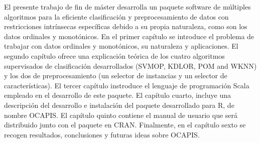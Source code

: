 
El presente trabajo de fin de máster desarrolla un paquete software de múltiples algoritmos para la eficiente clasificación y preprocesamiento de datos con restricciones intrínsecas específicas debido a su propia naturaleza, como son los datos ordinales y monotónicos. \newline
En el primer capítulo se introduce el problema de trabajar con datos ordinales y monotónicos, su naturaleza y aplicaciones. El segundo capítulo ofrece una explicación teórica de  los cuatro algoritmos supervisados de clasificación desarrollados (SVMOP, KDLOR, POM and WKNN) y los dos de preprocesamiento (un  selector de instancias y un selector de características). El tercer capítulo instroduce el lenguaje de programación Scala empleado en el desarrollo de este paquete. El capítulo cuarto, incluye una descripción del desarrollo e instalación del paquete desarrollado para R, de nombre OCAPIS. El capítulo quinto contiene el manual de usuario que será distribuido junto con el paquete en CRAN. Finalmente, en el capítulo sexto se recogen resultados, conclusiones y futuras ideas sobre OCAPIS.
\newline \newline
{}
\newline {}